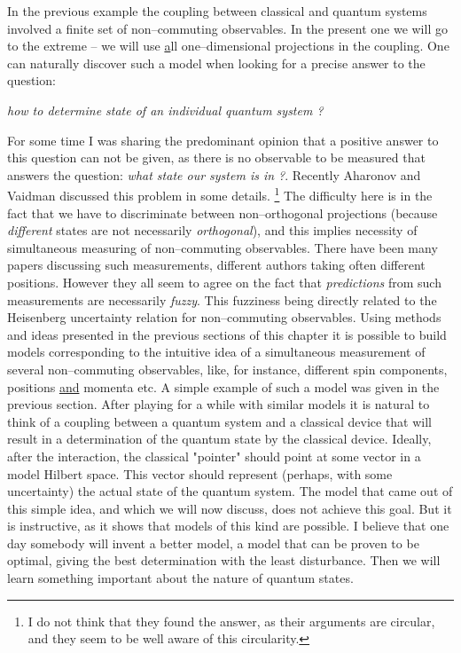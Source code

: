 \documentclass[12pt]{article}
\begin{document}
In the previous example the coupling between classical and quantum
systems involved a finite set of non--commuting observables.  In the
present one we will go to the extreme -- we will use {\underline all}
one--dimensional projections in the coupling.  One can naturally discover
such a model when looking for a precise answer to the question: 
\begin{center} {\sl how
to determine state of an individual quantum system ?}
\end{center}
For some time I was sharing the predominant opinion
 that a positive answer to this question can
not be given,  as there is no observable to be measured that answers the
question:  {\sl what state our system is in ?}.  Recently Aharonov and
Vaidman
\cite{aha} discussed this problem in some details.  \footnote{I do not
think that they found the answer,  as their arguments 
are circular,  and they seem to be well aware of this circularity. } 
The
difficulty here is in the fact that we have to discriminate between
non--orthogonal projections  (because {\sl different} states are not
necessarily {\sl orthogonal}),  and this implies necessity of 
simultaneous measuring
of non--commuting observables.  There have been many papers discussing
such measurements,  different authors taking often different positions.  
However they all seem to agree on  the fact that {\sl
predictions} from such measurements are necessarily {\sl fuzzy}.  
This fuzziness
being directly related to the Heisenberg uncertainty relation for
non--commuting observables.  Using methods and ideas presented 
in the previous 
sections of this chapter it is possible to build
models corresponding to the intuitive idea of a simultaneous
measurement of several non--commuting observables,  like,  for instance, 
 different spin components,  
positions \underline{and}
momenta etc.  A simple example of such a model was given in the 
previous section.  
After playing for a while with similar models it is
natural to think of a coupling between a quantum system and a
classical device that will result in a determination of the quantum state
by the classical device.  Ideally,  after the interaction,  the classical
"pointer" should point at some vector in a model
 Hilbert space.  This vector should
represent  (perhaps,  with some uncertainty) the actual state of the
quantum system.  The model that came out of this simple idea,  and which
we will now discuss,  does not achieve this goal.  But it is instructive, 
as it shows that models of this kind are possible.  I believe that one day
somebody will invent a better model,  a model that can be proven to be
optimal,  giving the best determination with the least disturbance.  Then
we will learn something important about the nature of quantum states. 
\end{document}
